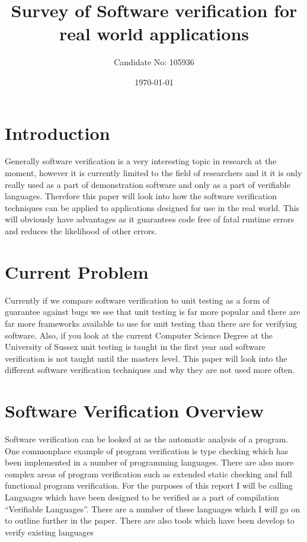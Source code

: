 \documentclass[a4paper,12pt]{scrartcl}
\title{Survey of Software verification for real world applications}
\author{Candidate No: 105936}
\date{\today}
\begin{document}
	
	\begin{titlepage}
		\maketitle
	\end{titlepage}
	
	\tableofcontents
	\newpage
	\section{Introduction}
	{
		Generally software verification is a very interesting topic in research at the moment, however it is currently limited to the field of researchers and it it is only really used as a part of demonstration software and only as a part of verifiable languages. Therefore this paper will look into how the software verification techniques can be applied to applications designed for use in the real world. This will obviously have advantages as it guarantees code free of fatal runtime errors and reduces the likelihood of other errors.
	}

	\section{Current Problem}
	{
		Currently if we compare software verification to unit testing as a form of guarantee against bugs we see that unit testing is far more popular and there are far more frameworks available to use for unit testing than there are for verifying software. Also, if you look at the current Computer Science Degree at the University of Sussex unit testing is taught in the first year and software verification is not taught until the masters level. This paper will look into the different software verification techniques and why they are not used more often.
	}

	\section{Software Verification Overview}
	{
		Software verification can be looked at as the automatic analysis of a program. One commonplace example of program verification is type checking which has been implemented in a number of programming languages. There are also more complex areas of program verification such as extended static checking and full functional program verification. For the purposes of this report I will be calling Languages which have been designed to be verified as a part of compilation \enquote{Verifiable Languages}. There are a number of these languages which I will go on to outline further in the paper. There are also tools which have been develop to verify existing languages
	}
	
\end{document}
